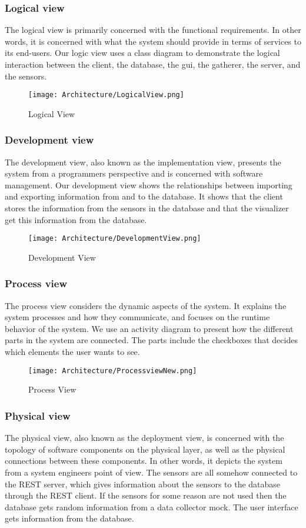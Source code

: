 \documentclass[../document.tex]{subfiles}
\begin{document}
\subsubsection{Logical view}		
The logical view is primarily concerned with the functional requirements. In other words, it is concerned with what the system should provide in terms of services to its end-users. Our logic view uses a class diagram to demonstrate the logical interaction between the client, the database, the gui, the gatherer, the server, and the sensors. 

\begin{figure}[H]
\centering
\texttt{[image: Architecture/LogicalView.png]}
\caption{Logical View}
\end{figure}

\subsubsection{Development view}
The development view, also known as the implementation view,  presents the system from a programmers perspective and is concerned with software management. Our development view shows the relationships between importing and exporting information from and to the database. It shows that the client stores the information from the sensors in the database and that the visualizer get this information from the database.

\begin{figure}[H]
\centering
\texttt{[image: Architecture/DevelopmentView.png]}
\caption{Development View}
\end{figure}

\subsubsection{Process view}
The process view considers the dynamic aspects of the system. It explains the system processes and how they communicate, and focuses on the runtime behavior of the system. We use an activity diagram to present how the different parts in the system are connected. The parts include the checkboxes that decides which elements the user wants to see. 

\begin{figure}[H]
\centering
\texttt{[image: Architecture/ProcessviewNew.png]}
\caption{Process View}
\end{figure}

\subsubsection{Physical view}
The physical view, also known as the deployment view, is concerned with the topology of software components on the physical layer, as well as the physical connections between these components. In other words, it depicts the system from a system engineers point of view. The sensors are all somehow connected to the REST server, which gives information about the sensors to the database through the REST client. If the sensors for some reason are not used then the database gets random information from a data collector mock. The user interface gets information from the database.
\end{document}
